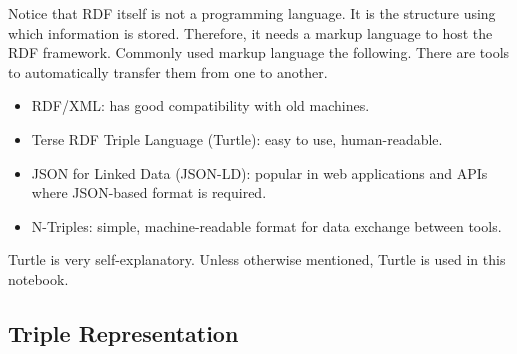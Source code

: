 Notice that RDF itself is not a programming language. It is the structure using which information is stored. Therefore, it needs a markup language to host the RDF framework. Commonly used markup language the following. There are tools to automatically transfer them from one to another.
\begin{itemize}
  \item RDF/XML: has good compatibility with old machines.
  \item Terse RDF Triple Language (Turtle): easy to use, human-readable.
  \item JSON for Linked Data (JSON-LD): popular in web applications and APIs where JSON-based format is required.
  \item N-Triples: simple, machine-readable format for data exchange between tools.
\end{itemize}
Turtle is very self-explanatory. Unless otherwise mentioned, Turtle is used in this notebook.

\subsection{Triple Representation}

